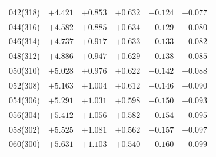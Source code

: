 \begin{table}[!h]
\begin{tabular}{rrrrrr}
042(318) & $+4.421$ & $+0.853$ & $+0.632$ & $-0.124$ & $-0.077$ \\ 
044(316) & $+4.582$ & $+0.885$ & $+0.634$ & $-0.129$ & $-0.080$ \\ 
046(314) & $+4.737$ & $+0.917$ & $+0.633$ & $-0.133$ & $-0.082$ \\ 
048(312) & $+4.886$ & $+0.947$ & $+0.629$ & $-0.138$ & $-0.085$ \\ 
050(310) & $+5.028$ & $+0.976$ & $+0.622$ & $-0.142$ & $-0.088$ \\
052(308) & $+5.163$ & $+1.004$ & $+0.612$ & $-0.146$ & $-0.090$ \\ 
054(306) & $+5.291$ & $+1.031$ & $+0.598$ & $-0.150$ & $-0.093$ \\ 
056(304) & $+5.412$ & $+1.056$ & $+0.582$ & $-0.154$ & $-0.095$ \\ 
058(302) & $+5.525$ & $+1.081$ & $+0.562$ & $-0.157$ & $-0.097$ \\ 
060(300) & $+5.631$ & $+1.103$ & $+0.540$ & $-0.160$ & $-0.099$ \\
\end{tabular}
\end{table}

